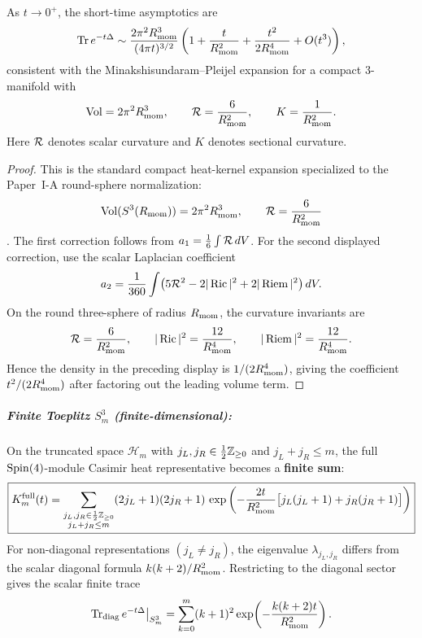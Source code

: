 \documentclass[12pt,a4paper]{article}
\begin{document}
\begin{proposition}
\label{p2:prop:heat-trace-asymptotics}
As \(t \to 0^+\), the short-time asymptotics are
\cite{minakshisundaram1949some,berline1992heat}
\[
\mathrm{Tr}\, e^{-t\Delta}
\sim \frac{2\pi^2 R_{\mathrm{mom}}^3}{(4\pi t)^{3/2}}
\left(1 + \frac{t}{R_{\mathrm{mom}}^2} + \frac{t^2}{2R_{\mathrm{mom}}^4}+O(t^3)\right),
\]
consistent with the Minakshisundaram--Pleijel expansion for a compact
\(3\)-manifold with
\[
\operatorname{Vol}=2\pi^2R_{\mathrm{mom}}^3,\qquad
\mathcal R=\frac{6}{R_{\mathrm{mom}}^2},\qquad
K=\frac{1}{R_{\mathrm{mom}}^2}.
\]
Here \(\mathcal R\) denotes scalar curvature and \(K\) denotes sectional curvature.
\end{proposition}

\begin{proof}
This is the standard compact heat-kernel expansion specialized to the Paper~I-A
round-sphere normalization:
\[
  \operatorname{Vol}(S^3(R_{\mathrm{mom}}))=2\pi^2R_{\mathrm{mom}}^3,
  \qquad
  \mathcal R=\frac{6}{R_{\mathrm{mom}}^2}
\]
\cite{Kugelmann2026a,minakshisundaram1949some,berline1992heat}.  The first
correction follows from \(a_1=\frac16\int\mathcal R\,dV\).  For the second displayed
correction, use the scalar Laplacian coefficient
\[
a_2=\frac1{360}\int
\bigl(5\mathcal R^2-2|\operatorname{Ric}|^2+2|\operatorname{Riem}|^2\bigr)\,dV .
\]
On the round three-sphere of radius \(R_{\mathrm{mom}}\), the curvature invariants are
\[
  \mathcal R=\frac{6}{R_{\mathrm{mom}}^2},
  \qquad
  |\operatorname{Ric}|^2=\frac{12}{R_{\mathrm{mom}}^4},
  \qquad
  |\operatorname{Riem}|^2=\frac{12}{R_{\mathrm{mom}}^4}.
\]
Hence the density in the preceding display is \(1/(2R_{\mathrm{mom}}^4)\), giving the
coefficient \(t^2/(2R_{\mathrm{mom}}^4)\) after factoring out the leading volume term.
\end{proof}


\subparagraph{\texorpdfstring{Finite Toeplitz $S^3_m$ (finite-dimensional):}{Finite Toeplitz S^3_m (finite-dimensional):}}
On the truncated space $\mathcal{H}_m$ with $j_L,j_R\in\frac12\mathbb{Z}_{\ge0}$
and $j_L + j_R \leq m$, the full \(\mathrm{Spin}(4)\)-module Casimir heat
representative becomes a \textbf{finite sum}:
\[
\boxed{K_m^{\rm full}(t)
= \sum_{\substack{j_L,j_R\in\frac12\mathbb{Z}_{\ge0} \\ j_L + j_R \leq m}} (2j_L+1)(2j_R+1) \, 
\exp\left(-\frac{2t}{R_{\mathrm{mom}}^2}\bigl[j_L(j_L+1) + j_R(j_R+1)\bigr]\right)}
\]
For non-diagonal representations \((j_L\neq j_R)\), the eigenvalue \(\lambda_{j_L,j_R}\) differs from the scalar diagonal formula \(k(k+2)/R_{\mathrm{mom}}^2\).  Restricting to the diagonal sector gives the scalar finite trace
\[
\mathrm{Tr}_{\mathrm{diag}}\, e^{-t\Delta}\big|_{S^3_m}
=
\sum_{k=0}^{m}(k+1)^2
\exp\!\left(-\frac{k(k+2)t}{R_{\mathrm{mom}}^2}\right).
\]
\end{document}

